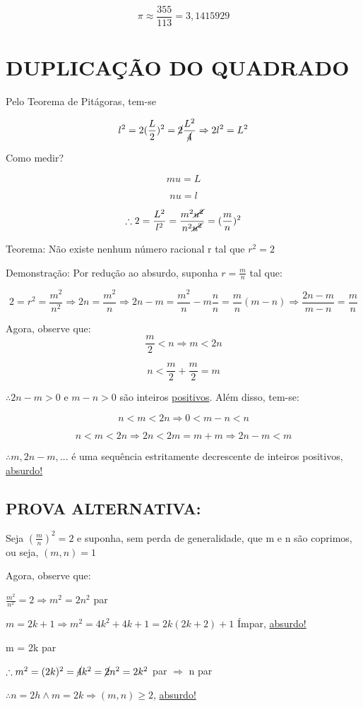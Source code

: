 \documentclass[a4paper, 12pt]{article}
\begin{document}
\[\pi \approx \frac{355}{113} = 3,1415929\]

\newpage

\section{DUPLICAÇÃO DO QUADRADO}

{Pelo Teorema de Pitágoras, tem-se}

\[l^2 = 2 (\frac{L}{2})^2 = \cancel{2} \frac{L^2}{\cancel{4}} \Rightarrow 2l^2 = L^2\]

{Como medir?}

\[mu = L\]

\[nu = l\]

\[\therefore 2 = \frac{L^2}{l^2} = \frac{m^2 \cancel{u^2}}{n^2 \cancel{u^2}} = (\frac{m}{n})^2\]

{Teorema: Não existe nenhum número racional r tal que $r^2 = 2$}

{Demonstração: Por redução ao absurdo, suponha $r= \frac{m}{n}$ tal que:}

\[2=r^2 = \frac{m^2}{n^2} \Rightarrow 2n = \frac{m^2}{n} \Rightarrow 2n - m = \frac{m^2}{n} - m\frac{n}{n} = \frac{m}{n} (m-n) \Rightarrow \frac{2n-m}{m-n} = \frac{m}{n}\]

{Agora, observe que:}
\[\frac{m}{2} < n \Rightarrow m < 2n\]

\[n < \frac{m}{2} + \frac{m}{2} = m\]

{$\therefore 2n-m > 0$ e $ m-n > 0$ são inteiros \underline{positivos}. Além disso, tem-se:}

\[n < m < 2n \Rightarrow 0 < m-n < n\]

\[n < m < 2n \Rightarrow 2n < 2m = m + m \Rightarrow 2n - m < m\]


{$\therefore m, 2n-m,...$ é uma sequência estritamente decrescente de inteiros positivos, \underline{absurdo!}}

\subsection{PROVA ALTERNATIVA:} 

{Seja $(\frac{m}{n})^2 = 2$ e suponha, sem perda de generalidade, que m e n são coprimos, ou seja, $(m,n)=1$}

Agora, observe que:

\begin{center}
$\frac{m^2}{n^2} = 2 \Rightarrow m^2 = 2n^2$ par 

$m = 2k + 1 \Rightarrow m^2 = 4k^2 + 4k + 1 = 2k(2k + 2) + 1$ Ímpar, \underline{absurdo!}

{m = 2k par}

$\therefore m^2 = (2k)^2 = \cancel{4}k^2 = \cancel{2}n^2 = 2k^2$ par $\Rightarrow$ n par

$\therefore n = 2h \wedge  m = 2k \Rightarrow (m,n) \ge 2$, \underline{absurdo!}
\end{center}
\end{document}
